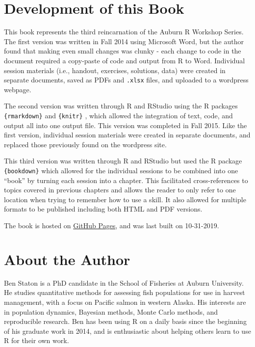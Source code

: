 \documentclass[]{book}
\begin{document}
\hypertarget{development-of-this-book}{%
\section*{Development of this Book}\label{development-of-this-book}}

This book represents the third reincarnation of the Auburn R Workshop Series. The first version was written in Fall 2014 using Microsoft Word, but the author found that making even small changes was clunky - each change to code in the document required a copy-paste of code and output from R to Word. Individual session materials (i.e., handout, exercises, solutions, data) were created in separate documents, saved as PDFs and \texttt{.xlsx} files, and uploaded to a wordpress webpage.

The second version was written through R \citep{R-base} and RStudio using the R packages \texttt{\{rmarkdown\}} \citep{R-rmarkdown} and \texttt{\{knitr\}} \citep{R-knitr, knitr-cite}, which allowed the integration of text, code, and output all into one output file. This version was completed in Fall 2015. Like the first version, individual session materials were created in separate documents, and replaced those previously found on the wordpress site.

This third version was written through R and RStudio but used the R package \texttt{\{bookdown\}} \citep{R-bookdown} which allowed for the individual sessions to be combined into one ``book'' by turning each session into a chapter. This facilitated cross-references to topics covered in previous chapters and allows the reader to only refer to one location when trying to remember how to use a skill. It also allowed for multiple formats to be published including both HTML and PDF versions.

The book is hosted on \href{https://pages.github.com/}{GitHub Pages}, and was last built on 10-31-2019.

\hypertarget{about-the-author}{%
\section*{About the Author}\label{about-the-author}}

Ben Staton is a PhD candidate in the School of Fisheries at Auburn University. He studies quantitative methods for assessing fish populations for use in harvest management, with a focus on Pacific salmon in western Alaska. His interests are in population dynamics, Bayesian methods, Monte Carlo methods, and reproducible research. Ben has been using R on a daily basis since the beginning of his graduate work in 2014, and is enthusiastic about helping others learn to use R for their own work.
\end{document}

